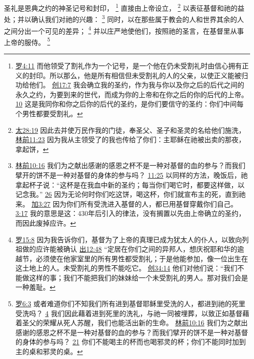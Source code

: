 \documentclass[12pt, a4paper, oneside]{ctexart}
\newcounter{parnum}[section]
\newcommand{\N}{%
   \noindent\refstepcounter{parnum}%
    \makebox[\parindent][l]{\textbf{\arabic{parnum}.}}}
\begin{document}
\N 圣礼是恩典之约的神圣记号和封印，
	\footnote {
		\href{https://biblehub.com/romans/4-11.htm}{罗4:11} 而他领受了割礼作为一个记号，是一个他在仍未受割礼时由信心拥有正义的封印。所以那么，他是所有相信但未受割礼的人的父亲，以使正义能被归功给他们。
		\href{https://biblehub.com/genesis/17-7.htm}{创17:7} 我会确立我的圣约，作为我与你以及你之后的后代之间的永久之约，为要到来的世代，而成为你的上帝和在你之后的你的后代的上帝。
		\href{https://biblehub.com/genesis/17-10.htm}{10} 这是我同你和你之后你的后代的圣约，是你们要信守的圣约：你们中间每个男性都要受割礼。
	}
	直接由上帝设立，
	\footnote {
		\href{https://biblehub.com/matthew/28-19.htm}{太28:19} 因此去并使万民作我的门徒，奉圣父、圣子和圣灵的名给他们施洗，
		\href{https://biblehub.com/1_corinthians/11-23.htm}{林前11:23} 因为我从主领受了的我也传给了你们：主耶稣在祂被出卖的那夜，拿起饼，
	}
	以表征基督和祂的益处；并以确认我们对祂的兴趣：
	\footnote {
		\href{https://biblehub.com/1_corinthians/10-16.htm}{林前10:16} 我们为之献出感谢的感恩之杯不是一种对基督的血的参与？而我们擘开的饼不是一种对基督的身体的参与吗？
		\href{https://biblehub.com/1_corinthians/11-25.htm}{11:25} 以同样的方法，晚饭后，祂拿起杯子说：“这杯是在我血中新的圣约；每当你们喝它时，都要这样做，以记念我。”
		\href{https://biblehub.com/1_corinthians/11-26.htm}{26} 因为无论何时你们吃这饼，喝这杯，你们就宣布主的死，直到祂来。
		\href{https://biblehub.com/galatians/3-27.htm}{加3:27} 因为你们所有受洗进入基督的人，都已用基督穿戴你们自己。
		\href{https://biblehub.com/galatians/3-17.htm}{3:17} 我的意思是这：430年后引入的律法，没有搁置以先由上帝确立的圣约，而因此废掉应许。
	}
	同时，以在那些属于教会的人和世界其余的人之间分出一个可见的差异；
	\footnote {
		\href{https://biblehub.com/romans/15-8.htm}{罗15:8} 因为我告诉你们，基督为了上帝的真理已成为犹太人的仆人，以致向列祖做的应许能被确认
		\href{https://biblehub.com/exodus/12-48.htm}{出12:48} “定居在你们之间的异邦人，想庆祝耶和华的逾越节，必须使在他家室里的所有男性都受割礼；于是他能参加，像一位出生在这土地上的人。未受割礼的男性不能吃它。
		\href{https://biblehub.com/genesis/34-14.htm}{创34:14} 他们对他们说：“我们不能做这样的事；我们不能把我们的妹妹给一个未受割礼的男人。那对我们会是一种羞耻。
	}
	并以庄严地使他们，按照祂的圣言，在基督里从事上帝的服侍。
	\footnote {
		\href{https://biblehub.com/romans/6-3.htm}{罗6:3} 或者难道你们不知我们所有进到基督耶稣里受洗的人，都进到祂的死里受洗吗？
		\href{https://biblehub.com/romans/6-4.htm}{4} 我们因此藉着进到死里的洗礼，与祂一同被埋葬，以致正如基督藉着圣父的荣耀从死人苏醒，我们也能活出新的生命。
		\href{https://biblehub.com/1_corinthians/10-16.htm}{林前10:16} 我们为之献出感谢的感恩之杯不是一种对基督的血的参与？而我们擘开的饼不是一种对基督的身体的参与吗？
		\href{https://biblehub.com/1_corinthians/10-21.htm}{21} 你们不能喝主的杯而也喝邪灵的杯；你们不能同时加到主的桌和邪灵的桌。
	}
\end{document}
